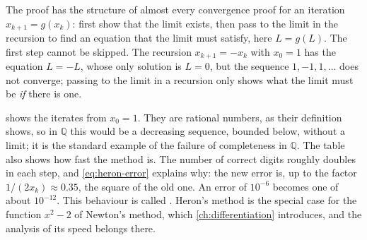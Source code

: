 The proof has the structure of almost every convergence proof for an iteration $x_{k+1}=g(x_k)$: first show that the limit exists, then pass to the limit in the recursion to find an equation that the limit must satisfy, here $L=g(L)$. The first step cannot be skipped. The recursion $x_{k+1}=-x_k$ with $x_0=1$ has the equation $L=-L$, whose only solution is $L=0$, but the sequence $1,-1,1,\ldots$ does not converge; passing to the limit in a recursion only shows what the limit must be \emph{if} there is one.

 shows the iterates from $x_0=1$. They are rational numbers, as their definition shows, so in $\mathbb Q$ this would be a decreasing sequence, bounded below, without a limit; it is the standard example of the failure of completeness in $\mathbb Q$. The table also shows how fast the method is. The number of correct digits roughly doubles in each step, and \eqref{eq:heron-error} explains why: the new error is, up to the factor $1/(2x_k)\approx0.35$, the square of the old one. An error of $10^{-6}$ becomes one of about $10^{-12}$. This behaviour is called . Heron's method is the special case for the function $x^2-2$ of Newton's method, which \cref{ch:differentiation} introduces, and the analysis of its speed belongs there.

\begin{table}
\end{table}

